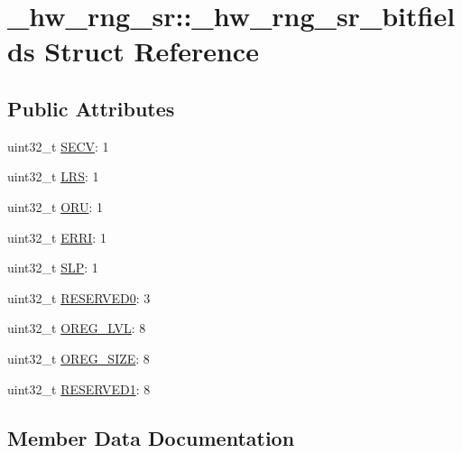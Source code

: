 \hypertarget{struct__hw__rng__sr_1_1__hw__rng__sr__bitfields}{}\section{\+\_\+hw\+\_\+rng\+\_\+sr\+:\+:\+\_\+hw\+\_\+rng\+\_\+sr\+\_\+bitfields Struct Reference}
\label{struct__hw__rng__sr_1_1__hw__rng__sr__bitfields}
\subsection*{Public Attributes}
\begin{DoxyCompactItemize}
\item 
uint32\+\_\+t \hyperlink{struct__hw__rng__sr_1_1__hw__rng__sr__bitfields_a8568ac8680c40b429f54b78d957f0931}{S\+E\+CV}\+: 1
\item 
uint32\+\_\+t \hyperlink{struct__hw__rng__sr_1_1__hw__rng__sr__bitfields_ac87875145e63d7b02a5997966524cfbf}{L\+RS}\+: 1
\item 
uint32\+\_\+t \hyperlink{struct__hw__rng__sr_1_1__hw__rng__sr__bitfields_a88e75785cb79fcf784707e278ac04ef4}{O\+RU}\+: 1
\item 
uint32\+\_\+t \hyperlink{struct__hw__rng__sr_1_1__hw__rng__sr__bitfields_a24bf9c981b75935fe8bc997f9f939684}{E\+R\+RI}\+: 1
\item 
uint32\+\_\+t \hyperlink{struct__hw__rng__sr_1_1__hw__rng__sr__bitfields_a945eb42ba7495e5c5f0bf35aa774c072}{S\+LP}\+: 1
\item 
uint32\+\_\+t \hyperlink{struct__hw__rng__sr_1_1__hw__rng__sr__bitfields_a98713a1421175f5ffe5e076148f1cd3c}{R\+E\+S\+E\+R\+V\+E\+D0}\+: 3
\item 
uint32\+\_\+t \hyperlink{struct__hw__rng__sr_1_1__hw__rng__sr__bitfields_aa71b33e575a37b117d43b221c3318e5d}{O\+R\+E\+G\+\_\+\+L\+VL}\+: 8
\item 
uint32\+\_\+t \hyperlink{struct__hw__rng__sr_1_1__hw__rng__sr__bitfields_a47230f7c4fb9c487dc0d47e9b88a5600}{O\+R\+E\+G\+\_\+\+S\+I\+ZE}\+: 8
\item 
uint32\+\_\+t \hyperlink{struct__hw__rng__sr_1_1__hw__rng__sr__bitfields_a4fff69f633073861fc42097ba59bf876}{R\+E\+S\+E\+R\+V\+E\+D1}\+: 8
\end{DoxyCompactItemize}


\subsection{Member Data Documentation}
